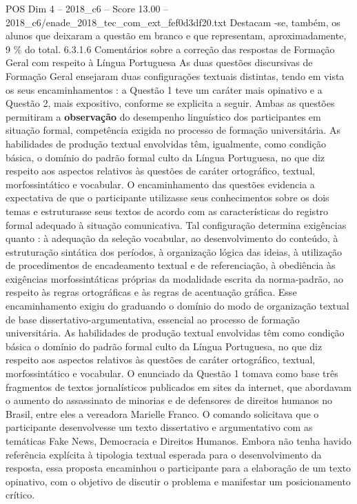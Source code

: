 \begin{textsample}{POS Dim 4 – 2018\_c6 – Score 13.00 – 2018\_c6/enade\_2018\_tec\_com\_ext\_fef0d3df20.txt}
Destacam -se, também, os alunos que deixaram a questão em branco e que representam, aproximadamente, 9 \% do total. 6.3.1.6 Comentários sobre a correção das respostas de Formação Geral com respeito à Língua Portuguesa As duas questões discursivas de Formação Geral ensejaram duas configurações textuais distintas, tendo em vista os seus encaminhamentos : a Questão 1 teve um caráter mais opinativo e a Questão 2, mais expositivo, conforme se explicita a seguir.
Ambas as questões permitiram a \textbf{observação} do desempenho linguístico dos participantes em situação formal, competência exigida no processo de formação universitária.
As habilidades de produção textual envolvidas têm, igualmente, como condição básica, o domínio do padrão formal culto da Língua Portuguesa, no que diz respeito aos aspectos relativos às questões de caráter ortográfico, textual, morfossintático e vocabular.
O encaminhamento das questões evidencia a expectativa de que o participante utilizasse seus conhecimentos sobre os dois temas e estruturasse seus textos de acordo com as características do registro formal adequado à situação comunicativa.
Tal configuração determina exigências quanto : à adequação da seleção vocabular, ao desenvolvimento do conteúdo, à estruturação sintática dos períodos, à organização lógica das ideias, à utilização de procedimentos de encadeamento textual e de referenciação, à obediência às exigências morfossintáticas próprias da modalidade escrita da norma-padrão, ao respeito às regras ortográficas e às regras de acentuação gráfica.
Esse encaminhamento exigiu do graduando o domínio do modo de organização textual de base dissertativo-argumentativa, essencial ao processo de formação universitária.
As habilidades de produção textual envolvidas têm como condição básica o domínio do padrão formal culto da Língua Portuguesa, no que diz respeito aos aspectos relativos às questões de caráter ortográfico, textual, morfossintático e vocabular.
O enunciado da Questão 1 tomava como base três fragmentos de textos jornalísticos publicados em sites da internet, que abordavam o aumento do assassinato de minorias e de defensores de direitos humanos no Brasil, entre eles a vereadora Marielle Franco.
O comando solicitava que o participante desenvolvesse um texto dissertativo e argumentativo com as temáticas Fake News, Democracia e Direitos Humanos.
Embora não tenha havido referência explícita à tipologia textual esperada para o desenvolvimento da resposta, essa proposta encaminhou o participante para a elaboração de um texto opinativo, com o objetivo de discutir o problema e manifestar um posicionamento crítico.

\end{textsample}
